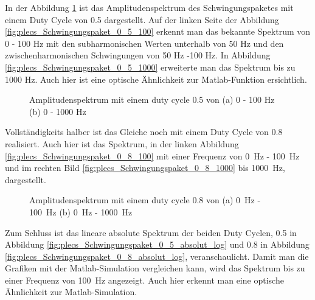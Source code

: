 In der Abbildung \ref{fig:plecs_Schwingungspakete_Amplitudenspektrum_ 0_5_100_1000} ist das Amplitudenspektrum des Schwingungspaketes mit einem Duty Cycle von 0.5 dargestellt. Auf der linken Seite der Abbildung \ref{fig:plecs_Schwingungspaket_0_5_100} erkennt man das bekannte Spektrum von 0 - 100 Hz mit den subharmonischen Werten unterhalb von 50 Hz und den zwischenharmonischen Schwingungen von 50 Hz -100 Hz. In Abbildung  \ref{fig:plecs_Schwingungspaket_0_5_1000} erweiterte man das Spektrum bis zu 1000 Hz. Auch hier ist eine optische Ähnlichkeit zur  Matlab-Funktion ersichtlich.     
\begin{figure}[ht!]
	\centering
	\qquad
	\caption{Amplitudenspektrum mit einem duty cycle 0.5 von (a) 0 - 100 Hz (b) 0 - 1000 Hz}
	\label{fig:plecs_Schwingungspakete_Amplitudenspektrum_ 0_5_100_1000}
\end{figure}


Vollständigkeits halber ist das Gleiche noch mit einem Duty Cycle von 0.8 realisiert. Auch hier ist das Spektrum, in der linken Abbildung \ref{fig:plecs_Schwingungspaket_0_8_100} mit einer Frequenz von \SI{0}{Hz} - \SI{100}{Hz} und im rechten Bild \ref{fig:plecs_Schwingungspaket_0_8_1000} bis \SI{1000}{Hz}, dargestellt. 


\begin{figure}[ht!]
	\centering
	\qquad
	\caption{Amplitudenspektrum mit einem duty cycle 0.8 von (a) \SI{0}{Hz} - \SI{100}{Hz} (b) \SI{0}{Hz} - \SI{1000}{Hz}}
	\label{fig:plecs_Schwingungspakete_Amplitudenspektrum_ 0_8_100_1000}
\end{figure}


Zum Schluss ist das lineare absolute Spektrum der beiden Duty Cyclen, 0.5 in Abbildung \ref{fig:plecs_Schwingungspaket_0_5_absolut_log} und 0.8 in Abbildung \ref{fig:plecs_Schwingungspaket_0_8_absolut_log}, veranschaulicht. Damit man die Grafiken mit der Matlab-Simulation vergleichen kann, wird das Spektrum bis zu einer Frequenz von \SI{100}{Hz} angezeigt. Auch hier erkennt man eine optische Ähnlichkeit zur Matlab-Simulation. 


